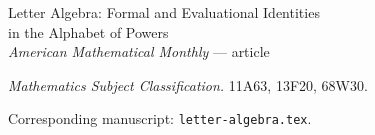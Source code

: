 \documentclass{article}
\begin{document}
\begin{center}
{\LARGE Letter Algebra: Formal and Evaluational Identities\\
in the Alphabet of Powers}\\[1.5em]
\textit{American Mathematical Monthly} --- article\\[1.5em]
\end{center}

\noindent
\textit{Mathematics Subject Classification.} 11A63, 13F20, 68W30.

\vspace{1em}
\noindent
Corresponding manuscript: \texttt{letter-algebra.tex}.
\end{document}
